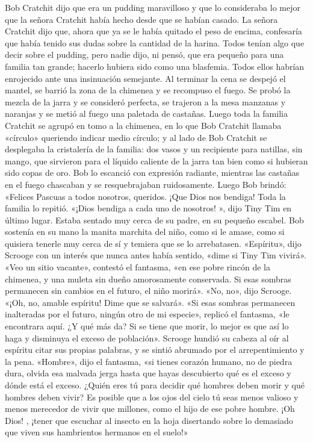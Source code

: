 \documentclass{novela}
\begin{document}
 Bob Cratchit dijo que era un pudding maravilloso y que lo consideraba lo mejor que la señora Cratchit había hecho desde que se habían casado. La señora Cratchit dijo que, ahora que ya se le había quitado el peso de encima, confesaría que había tenido sus dudas sobre la cantidad de la harina. Todos tenían algo que decir sobre el pudding, pero nadie dijo, ni pensó, que era pequeño para una familia tan grande; hacerlo hubiera sido como una blasfemia. Todos ellos habrían enrojecido ante una insinuación semejante.
 Al terminar la cena se despejó el mantel, se barrió la zona de la chimenea y se recompuso el fuego. Se probó la mezcla de la jarra y se consideró perfecta, se trajeron a la mesa manzanas y naranjas y se metió al fuego una paletada de castañas. Luego toda la familia Cratchit se agrupó en tomo a la chimenea, en lo que Bob Cratchit llamaba «círculo» queriendo indicar medio círculo; y al lado de Bob Cratchit se desplegaba la cristalería de la familia: dos vasos y un recipiente para natillas, sin mango, que sirvieron para el líquido caliente de la jarra tan bien como si hubieran sido copas de oro. Bob lo escanció con expresión radiante, mientras las castañas en el fuego chascaban y se resquebrajaban ruidosamente. Luego Bob brindó:
 «Felices Pascuas a todos nosotros, queridos. ¡Que Dios nos bendiga!
 Toda la familia lo repitió.
 «¡Dios bendiga a cada uno de nosotros! », dijo Tiny Tim en último lugar. Estaba sentado muy cerca de su padre, en su pequeño escabel. Bob sostenía en su mano la manita marchita del niño, como si le amase, como si quisiera tenerle muy cerca de sí y temiera que se lo arrebatasen.
 «Espíritu», dijo Scrooge con un interés que nunca antes había sentido, «dime si Tiny Tim vivirá».
 «Veo un sitio vacante», contestó el fantasma, «en ese pobre rincón de la chimenea, y una muleta sin dueño amorosamente conservada. Si esas sombras permanecen sin cambios en el futuro, el niño morirá».
 «No, no», dijo Scrooge. «¡Oh, no, amable espíritu! Dime que se salvará».
 «Si esas sombras permanecen inalteradas por el futuro, ningún otro de mi especie», replicó el fantasma, «le encontrara aquí. ¿Y qué más da? Si se tiene que morir, lo mejor es que así lo haga y disminuya el exceso de población».
 Scrooge hundió su cabeza al oír al espíritu citar sus propias palabras, y se sintió abrumado por el arrepentimiento y la pena.
 «Hombre», dijo el fantasma, «si tienes corazón humano, no de piedra dura, olvida esa malvada jerga hasta que hayas descubierto qué es el exceso y dónde está el exceso. ¿Quién eres tú para decidir qué hombres deben morir y qué hombres deben vivir? Es posible que a los ojos del cielo tú seas menos valioso y menos merecedor de vivir que millones, como el hijo de ese pobre hombre. ¡Oh Dios! , ¡tener que escuchar al insecto en la hoja disertando sobre lo demasiado que viven sus hambrientos hermanos en el suelo!»
\end{document}
